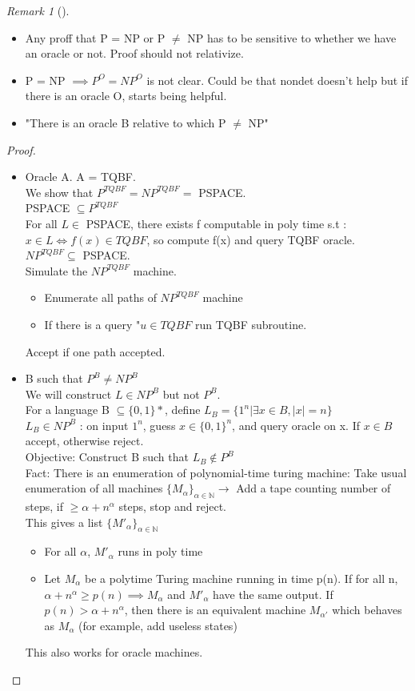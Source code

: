 \documentclass{article}
\theoremstyle{definition}
\theoremstyle{remark}
\newtheorem*{remark}{Remark}
\newcommand{\Rem}[3]{\begin{remark}[#1]\label{#2}#3\end{remark}}
\newcommand{\Proof}[1]{\begin{proof}#1\end{proof}}
\newcommand{\N}{\mathbb{N}}
\begin{document}
\Rem{}{}{\begin{itemize}
		\item Any proff that P = NP or P $\neq$ NP has to be sensitive to whether we have an oracle or not. Proof should not relativize.
		\item P = NP $\implies P^O = NP^O$ is not clear. Could be that nondet doesn't help but if there is an oracle O, starts being helpful.
		\item "There is an oracle B relative to which P $\neq$ NP"
	\end{itemize}}
\Proof{
\begin{itemize}
	\item Oracle A. A = TQBF.\\
	We show that $P^{TQBF} = NP^{TQBF} =$ PSPACE.\\
	
	PSPACE $\subseteq P^{TQBF}$\\
	For all $L \in$ PSPACE, there exists f computable in poly time s.t : $x \in L \Leftrightarrow f(x) \in TQBF$, so compute f(x) and query TQBF oracle.\\
	
	$NP^{TQBF} \subseteq$ PSPACE.\\
	Simulate the $NP^{TQBF}$ machine.
	\begin{itemize}
		\item Enumerate all paths of $NP^{TQBF}$ machine
		\item If there is a query "$u \in TQBF$ run TQBF subroutine.
	\end{itemize}
	Accept if one path accepted.
	
	\item B such that $P^B \neq NP^B$\\
	We will construct $L \in NP^B$ but not $P^B$.\\
	For a language B $\subseteq \{0,1\}*$, define $L_B = \{1^n |\exists x\in B,|x| = n \}$\\
	$L_B \in NP^B$ : on input $1^n$, guess $x\in \{0,1\}^n$, and query oracle on x. If $x\in B$ accept, otherwise reject.\\
	
	Objective: Construct B such that $L_B \notin P^B$\\
	
	Fact: There is an enumeration of polynomial-time turing machine: 
	Take usual enumeration of all machines $\{M_\alpha\}_{\alpha\in\N} \rightarrow$ Add a tape counting number of steps, if $\geq \alpha + n^\alpha$ steps, stop and reject.\\
	This gives a list $\{M'_\alpha\}_{\alpha\in\N}$\begin{itemize}
		\item For all $\alpha$, $M'_\alpha$ runs in poly time
		\item Let $M_\alpha$ be a polytime Turing machine running in time p(n). If for all n, $\alpha + n^\alpha \geq p(n) \implies M_\alpha$ and $M'_\alpha$ have the same output. If $p(n) > \alpha + n^\alpha$, then there is an equivalent machine $M_{\alpha'}$ which behaves as $M_\alpha$ (for example, add useless states)
	\end{itemize}
	This also works for oracle machines.\\
	

\end{itemize}}
\end{document}
